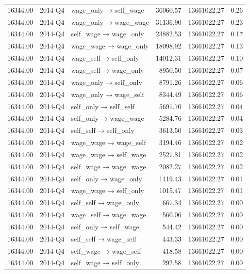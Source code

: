 \begin{table}[ht]
{\begin{tabular}{rllrrr}
  16344.00 & 2014-Q4 & wage\_only → self\_wage & 36060.57 & 13661022.27 & 0.26 \\ 
  16344.00 & 2014-Q4 & wage\_only → wage\_wage & 31136.90 & 13661022.27 & 0.23 \\ 
  16344.00 & 2014-Q4 & self\_wage → wage\_only & 23882.53 & 13661022.27 & 0.17 \\ 
  16344.00 & 2014-Q4 & wage\_wage → wage\_only & 18098.92 & 13661022.27 & 0.13 \\ 
  16344.00 & 2014-Q4 & wage\_self → self\_only & 14012.31 & 13661022.27 & 0.10 \\ 
  16344.00 & 2014-Q4 & wage\_self → wage\_only & 8950.50 & 13661022.27 & 0.07 \\ 
  16344.00 & 2014-Q4 & wage\_only → self\_only & 8791.26 & 13661022.27 & 0.06 \\ 
  16344.00 & 2014-Q4 & wage\_only → wage\_self & 8344.49 & 13661022.27 & 0.06 \\ 
  16344.00 & 2014-Q4 & self\_only → self\_self & 5691.70 & 13661022.27 & 0.04 \\ 
  16344.00 & 2014-Q4 & self\_only → wage\_wage & 5284.76 & 13661022.27 & 0.04 \\ 
  16344.00 & 2014-Q4 & self\_self → self\_only & 3613.50 & 13661022.27 & 0.03 \\ 
  16344.00 & 2014-Q4 & wage\_wage → wage\_self & 3194.46 & 13661022.27 & 0.02 \\ 
  16344.00 & 2014-Q4 & wage\_wage → self\_wage & 2527.81 & 13661022.27 & 0.02 \\ 
  16344.00 & 2014-Q4 & self\_wage → wage\_wage & 2082.27 & 13661022.27 & 0.02 \\ 
  16344.00 & 2014-Q4 & self\_only → wage\_only & 1419.43 & 13661022.27 & 0.01 \\ 
  16344.00 & 2014-Q4 & wage\_wage → self\_only & 1015.47 & 13661022.27 & 0.01 \\ 
  16344.00 & 2014-Q4 & self\_self → wage\_only & 667.34 & 13661022.27 & 0.00 \\ 
  16344.00 & 2014-Q4 & wage\_self → wage\_wage & 560.06 & 13661022.27 & 0.00 \\ 
  16344.00 & 2014-Q4 & self\_only → self\_wage & 544.42 & 13661022.27 & 0.00 \\ 
  16344.00 & 2014-Q4 & self\_self → wage\_self & 443.33 & 13661022.27 & 0.00 \\ 
  16344.00 & 2014-Q4 & self\_wage → wage\_self & 418.58 & 13661022.27 & 0.00 \\ 
  16344.00 & 2014-Q4 & self\_wage → self\_only & 292.58 & 13661022.27 & 0.00 \\ 

\end{tabular}}
\end{table}
